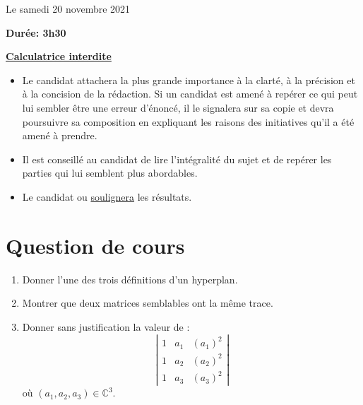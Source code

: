 \documentclass[twoside,french,11pt]{VcCours}
\begin{document}

\begin{center}
\large 
Le samedi 20 novembre 2021

\bigskip
\textbf{Durée: 3h30}

\bigskip
\large\underline{\textbf{Calculatrice interdite}}
\end{center}

\bigskip
\begin{itemize}
  \item Le candidat attachera la plus grande importance à la clarté, à la précision et à la concision de la rédaction. Si un candidat est amené à repérer ce qui peut lui sembler être une erreur d'énoncé, il le signalera sur sa copie et devra poursuivre sa composition en expliquant les raisons des initiatives qu'il a été amené à prendre.
  \item Il est conseillé au candidat de lire l'intégralité du sujet et de repérer les parties qui lui semblent plus abordables.
  \item Le candidat  ou \underline{soulignera} les résultats. 
  \end{itemize}
\separationTitre

\newpage
\section*{Question de cours}
\begin{enumerate}
  \item Donner l'une des trois définitions d'un hyperplan.
  \item Montrer que deux matrices semblables ont la même trace.
  \item Donner sans justification la valeur de :
  $$ \left\vert \begin{array}{ccc}
  1 & a_1 & (a_1)^2 \\
  1 & a_2 & (a_2)^2 \\
  1 & a_3 & (a_3)^2
  \end{array}\right\vert$$
  où $(a_1,a_2,a_3) \in \mathbb{C}^3$.
\end{enumerate}
\end{document}
